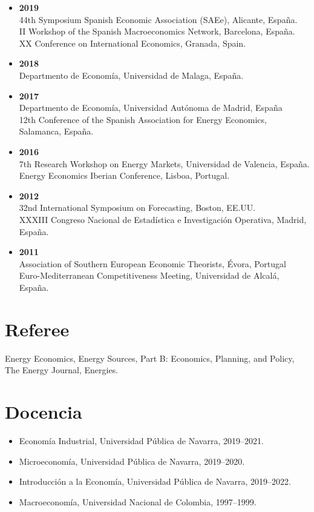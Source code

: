 \documentclass[11pt]{article}\usepackage[]{graphicx}\usepackage[usenames,dvipsnames]{xcolor}
\begin{document}
{\begin{itemize}
  \item \textbf{2019}\\
  44th Symposium Spanish Economic Association (SAEe), Alicante, España.\\
  II Workshop of the Spanish Macroeconomics Network, Barcelona, España.\\
  XX Conference on International Economics, Granada, Spain.
  \item \textbf{2018}\\
  Departmento de Economía, Universidad de Malaga, España.
    \item \textbf{2017}\\
  Departmento de Economía, Universidad Autónoma de Madrid, España\\
  12th Conference of the Spanish Association for Energy Economics, Salamanca, España.
  \item \textbf{2016}\\
  7th Research Workshop on Energy Markets, Universidad de Valencia, España.\\
  Energy Economics Iberian Conference, Lisboa, Portugal.
  \item \textbf{2012}\\
  32nd International Symposium on Forecasting, Boston, EE.UU.\\
  XXXIII Congreso Nacional de Estadística e Investigación Operativa, Madrid, España.
  \item \textbf{2011}\\
  Association of Southern European Economic Theorists, Évora, Portugal\\
  Euro-Mediterranean Competitiveness Meeting, Universidad de Alcalá, España.
\end{itemize}

\section{Referee} 

\raggedright
Energy Economics, Energy Sources, Part B: Economics, Planning, and Policy, The Energy Journal,  Energies.


\section{Docencia} 

\begin{itemize}
  \item Economía Industrial, Universidad Pública de Navarra, 2019--2021.
  \item Microeconomía, Universidad Pública de Navarra, 2019--2020.
  \item Introducción a la Economía, Universidad Pública de Navarra, 2019--2022.
  \item Macroeconomía, Universidad Nacional de Colombia, 1997--1999.
\end{itemize}

}
\end{document}
